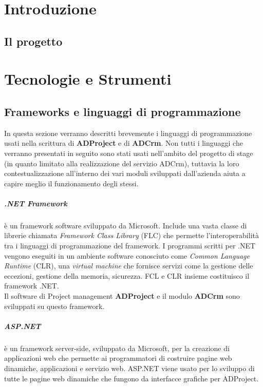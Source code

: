 \documentclass[12pt,a4paper,twoside,openright,english]{book}
\begin{document}
\chapter{Introduzione}\label{introduzione}
\section{Il progetto}
\chapter{Tecnologie e Strumenti}\label{tecnologie}
\section{Frameworks e linguaggi di programmazione}
In questa sezione verranno descritti brevemente i linguaggi di programmazione usati nella scrittura di \textbf{ADProject} e di \textbf{ADCrm}.
Non tutti i linguaggi che verranno presentati in seguito sono stati usati nell'ambito del progetto di stage (in quanto limitato alla realizzazione del servizio \large{ADCrm}), tuttavia la loro contestualizzazione all'interno dei vari moduli sviluppati dall'azienda aiuta a capire meglio il funzionamento degli stessi.

\paragraph{.NET Framework}
è un framework software sviluppato da Microsoft. Include una vasta classe di librerie chiamata \textit{Framework Class Library} (FLC) che permette l'interoperabilità tra i linguaggi di programmazione del framework. I programmi scritti per .NET vengono eseguiti in un ambiente software conosciuto come \textit{Common Language Runtime} (CLR), una \textit{virtual machine}  che fornisce servizi come la gestione delle eccezioni, gestione della memoria, sicurezza. FCL e CLR insieme costituisco il framework .NET.\\
Il software di Project management \textbf{ADProject} e il modulo \textbf{ADCrm} sono sviluppati su questo framework.

\paragraph{ASP.NET}
 è un framework server-side, sviluppato da Microsoft, per la creazione di applicazioni web che permette ai programmatori di costruire pagine web dinamiche, applicazioni e servizio web.
 ASP.NET viene usato per lo sviluppo di tutte le pagine web dinamiche che fungono da interfacce grafiche per ADProject.
\end{document}
